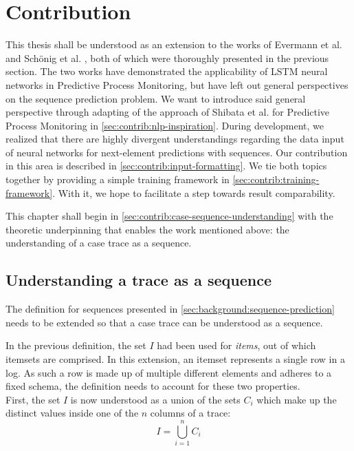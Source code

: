 \chapter{Contribution}\label{chap:contribution}
This thesis shall be understood as an extension to the works of Evermann et al. \cite{evermann2016} and Schönig et al. \cite{schoenig2018}, both of which were thoroughly presented in the previous section. The two works have demonstrated the applicability of LSTM neural networks in Predictive Process Monitoring, but have left out general perspectives on the sequence prediction problem.
We want to introduce said general perspective through adapting of the approach of Shibata et al. \cite{shibata2016bipartite} for Predictive Process Monitoring in \autoref{sec:contrib:nlp-inspiration}. During development, we realized that there are highly divergent understandings regarding the data input of neural networks for next-element predictions with sequences. Our contribution in this area is described in \autoref{sec:contrib:input-formatting}. We tie both topics together by providing a simple training framework in \autoref{sec:contrib:training-framework}. With it, we hope to facilitate a step towards result comparability. 

This chapter shall begin in \autoref{sec:contrib:case-sequence-understanding} with the theoretic underpinning that enables the work mentioned above: the understanding of a case trace as a sequence.\\

\section{Understanding a trace as a sequence}
\label{sec:contrib:case-sequence-understanding} 
The definition for sequences presented in \autoref{sec:background:sequence-prediction} needs to be extended so that a case trace can be understood as a sequence.

In the previous definition, the set $I$ had been used for \textit{items}, out of which itemsets are comprised. In this extension, an itemset represents a single row in a log. As such a row is made up of multiple different elements and adheres to a fixed schema, the definition needs to account for these two properties.\\

First, the set $I$ is now understood as a union of the sets $C_i$ which make up the distinct values inside one of the $n$ columns of a trace:
$$I = \bigcup\limits_{i=1}^{n} C_{i}$$

